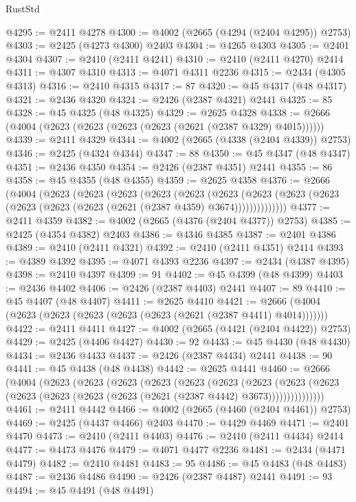 \begin{lexlean}{RustStd}
\begin{coremodule}
@4295 := @2411 @4278
@4300 := @4002 (@2665 (@4294 (@2404 @4295)) @2753)
@4303 := @2425 (@4273 @4300) @2403
@4304 := @4265 @4303
@4305 := @2401 @4304
@4307 := @2410 (@2411 @4241)
@4310 := @2410 (@2411 @4270) @2414
@4311 := @4307 @4310
@4313 := @4071 @4311 @2236
@4315 := @2434 (@4305 @4313)
@4316 := @2410 @4315
@4317 := 87
@4320 := @45 @4317 (@48 @4317)
@4321 := @2436 @4320
@4324 := @2426 (@2387 @4321) @2441
@4325 := 85
@4328 := @45 @4325 (@48 @4325)
@4329 := @2625 @4328
@4338 := @2666 (@4004 (@2623 (@2623 (@2623 (@2623 (@2621 (@2387 @4329) @4015))))))
@4339 := @2411 @4329
@4344 := @4002 (@2665 (@4338 (@2404 @4339)) @2753)
@4346 := @2425 (@4324 @4344)
@4347 := 88
@4350 := @45 @4347 (@48 @4347)
@4351 := @2436 @4350
@4354 := @2426 (@2387 @4351) @2441
@4355 := 86
@4358 := @45 @4355 (@48 @4355)
@4359 := @2625 @4358
@4376 := @2666
    (@4004
      (@2623
        (@2623
          (@2623
            (@2623
              (@2623
                (@2623
                  (@2623 (@2623 (@2623 (@2623 (@2623 (@2623 (@2621 (@2387 @4359) @3674))))))))))))))
@4377 := @2411 @4359
@4382 := @4002 (@2665 (@4376 (@2404 @4377)) @2753)
@4385 := @2425 (@4354 @4382) @2403
@4386 := @4346 @4385
@4387 := @2401 @4386
@4389 := @2410 (@2411 @4321)
@4392 := @2410 (@2411 @4351) @2414
@4393 := @4389 @4392
@4395 := @4071 @4393 @2236
@4397 := @2434 (@4387 @4395)
@4398 := @2410 @4397
@4399 := 91
@4402 := @45 @4399 (@48 @4399)
@4403 := @2436 @4402
@4406 := @2426 (@2387 @4403) @2441
@4407 := 89
@4410 := @45 @4407 (@48 @4407)
@4411 := @2625 @4410
@4421 := @2666 (@4004 (@2623 (@2623 (@2623 (@2623 (@2623 (@2621 (@2387 @4411) @4014)))))))
@4422 := @2411 @4411
@4427 := @4002 (@2665 (@4421 (@2404 @4422)) @2753)
@4429 := @2425 (@4406 @4427)
@4430 := 92
@4433 := @45 @4430 (@48 @4430)
@4434 := @2436 @4433
@4437 := @2426 (@2387 @4434) @2441
@4438 := 90
@4441 := @45 @4438 (@48 @4438)
@4442 := @2625 @4441
@4460 := @2666
    (@4004
      (@2623
        (@2623
          (@2623
            (@2623
              (@2623
                (@2623
                  (@2623
                    (@2623
                      (@2623 (@2623 (@2623 (@2623 (@2623 (@2621 (@2387 @4442) @3673)))))))))))))))
@4461 := @2411 @4442
@4466 := @4002 (@2665 (@4460 (@2404 @4461)) @2753)
@4469 := @2425 (@4437 @4466) @2403
@4470 := @4429 @4469
@4471 := @2401 @4470
@4473 := @2410 (@2411 @4403)
@4476 := @2410 (@2411 @4434) @2414
@4477 := @4473 @4476
@4479 := @4071 @4477 @2236
@4481 := @2434 (@4471 @4479)
@4482 := @2410 @4481
@4483 := 95
@4486 := @45 @4483 (@48 @4483)
@4487 := @2436 @4486
@4490 := @2426 (@2387 @4487) @2441
@4491 := 93
@4494 := @45 @4491 (@48 @4491)

\end{coremodule}
\end{lexlean}
